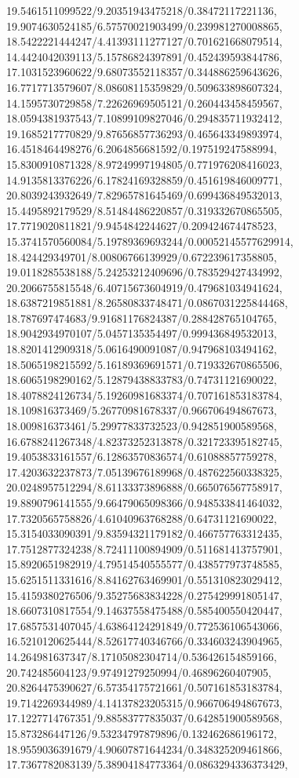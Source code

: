 {19.5461511099522/9.20351943475218/0.38472117221136,
19.9074630524185/6.57570021903499/0.239981270008865,
18.5422221444247/4.41393111277127/0.701621668079514,
14.4424042039113/5.15786824397891/0.452439593844786,
17.1031523960622/9.68073552118357/0.344886259643626,
16.7717713579607/8.08608115359829/0.509633898607324,
14.1595730729858/7.22626969505121/0.260443458459567,
18.0594381937543/7.10899109827046/0.294835711932412,
19.1685217770829/9.87656857736293/0.465643349893974,
16.4518464498276/6.2064856681592/0.197519247588994,
15.8300910871328/8.97249997194805/0.771976208416023,
14.9135813376226/6.17824169328859/0.451619846009771,
20.8039243932649/7.82965781645469/0.699436849532013,
15.4495892179529/8.51484486220857/0.319332670865505,
17.7719020811821/9.9454842244627/0.209424674478523,
15.3741570560084/5.19789369693244/0.00052145577629914,
18.424429349701/8.00806766139929/0.672239617358805,
19.0118285538188/5.24253212409696/0.783529427434992,
20.2066755815548/6.40715673604919/0.479681034941624,
18.6387219851881/8.26580833748471/0.0867031225844468,
18.787697474683/9.91681176824387/0.288428765104765,
18.9042934970107/5.0457135354497/0.999436849532013,
18.8201412909318/5.0616490091087/0.947968103494162,
18.5065198215592/5.16189369691571/0.719332670865506,
18.6065198290162/5.12879438833783/0.74731121690022,
18.4078824126734/5.19260981683374/0.707161853183784,
18.109816373469/5.26770981678337/0.966706494867673,
18.009816373461/5.29977833732523/0.942851900589568,
16.6788241267348/4.82373252313878/0.321723395182745,
19.4053833161557/6.12863570836574/0.61088857759278,
17.4203632237873/7.05139676189968/0.487622560338325,
20.0248957512294/8.61133373896888/0.665076567758917,
19.8890796141555/9.66479065098366/0.948533841464032,
17.7320565758826/4.61040963768288/0.64731121690022,
15.3154033090391/9.83594321179182/0.466757763312435,
17.7512877324238/8.72411100894909/0.511681413757901,
15.8920651982919/4.79514540555577/0.438577973748585,
15.6251511331616/8.84162763469901/0.551310823029412,
15.4159380276506/9.35275683834228/0.275429991805147,
18.6607310817554/9.14637558475488/0.585400550420447,
17.6857531407045/4.63864124291849/0.772536106543066,
16.5210120625444/8.52617740346766/0.334603243904965,
14.264981637347/8.17105082304714/0.536426154859166,
20.742485604123/9.97491279250994/0.46896260407905,
20.8264475390627/6.57354175721661/0.507161853183784,
19.7142269344989/4.14137823205315/0.966706494867673,
17.1227714767351/9.88583777835037/0.642851900589568,
15.873286447126/9.53234797879896/0.132462686196172,
18.9559036391679/4.90607871644234/0.348325209461866,
17.7367782083139/5.38904184773364/0.0863294336373429,
}

